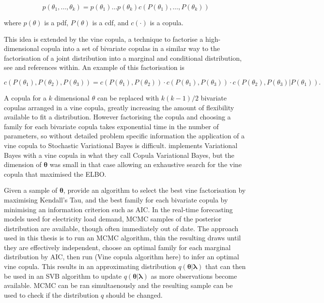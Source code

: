 \documentclass[12pt,a4paper]{article}%
\numberwithin{equation}{section}
\begin{document}
\begin{equation}
\label{vc1}
p(\theta_1, \dots, \theta_k) = p(\theta_1) \dots p(\theta_k) c(P(\theta_1), \dots, P(\theta_k))
\end{equation}

where $p(\theta)$ is a pdf, $P(\theta)$ is a cdf, and $c(\cdot)$ is a copula. 

This idea is extended by the vine copula, a technique to factorise a high-dimensional copula into a set of bivariate copulas in a similar way to the factorisation of a joint distribution into a marginal and conditional distribution, see \citet{Joe2014} and references within. An example of this factorisation is

\begin{equation}
\label{vc2}
c(P(\theta_1), P(\theta_2), P(\theta_3)) = c(P(\theta_1), P(\theta_2)) \cdot c(P(\theta_1), P(\theta_3)) \cdot c(P(\theta_2), P(\theta_3) | P(\theta_1)).
\end{equation}

A copula for a $k$ dimensional $\theta$ can be replaced with $k(k-1)/2$ bivariate copulas arranged in a vine copula, greatly increasing the amount of flexibility available to fit a distribution. However factorising the copula and choosing a family for each bivariate copula takes exponential time in the number of parameters, so without detailed problem specific information the application of a vine copula to Stochastic Variational Bayes is difficult. \citet{Tran2015} implements Variational Bayes with a vine copula in what they call Copula Variational Bayes, but the dimension of $\boldsymbol{\theta}$ was small in that case allowing an exhaustive search for the vine copula that maximised the ELBO. 

Given a sample of $\boldsymbol{\theta}$, \citet{Dssmann2013} provide an algorithm to select the best vine factorisation by maximising Kendall's Tau, and the best family for each bivariate copula by minimising an information criterion such as AIC. In the real-time forecasting models used for electricity load demand, MCMC samples of the posterior distribution are available, though often immediately out of date. The approach used in this thesis is to run an MCMC algorithm, thin the resulting draws until they are effectively independent, choose an optimal family for each marginal distribution by AIC, then run (Vine copula algorithm here) to infer an optimal vine copula. This results in an approximating distribution $q(\boldsymbol{\theta} | \boldsymbol{\lambda})$ that can then be used in an SVB algorithm to update $q(\boldsymbol{\theta} | \boldsymbol{\lambda})$ as more observations become available. MCMC can be ran simultaenously and the resulting sample can be used to check if the distribution $q$ should be changed. 
\end{document}
